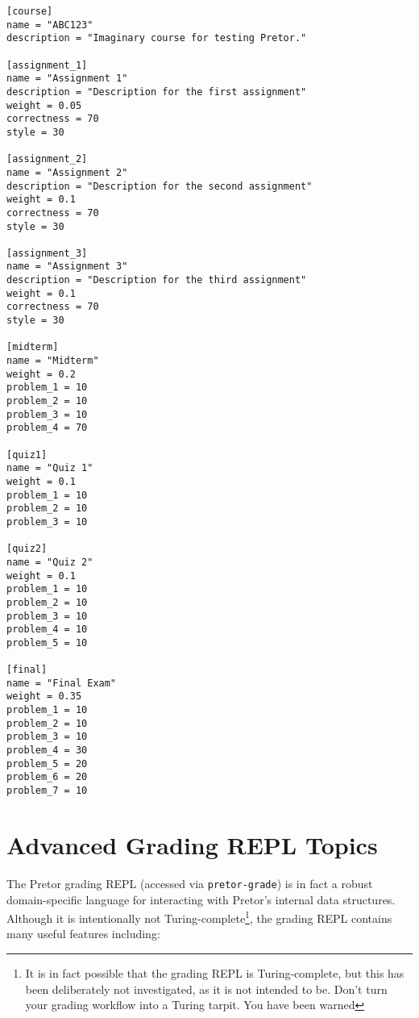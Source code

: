 \documentclass{book}
\begin{document}
\begin{verbatim}
[course]
name = "ABC123"
description = "Imaginary course for testing Pretor."

[assignment_1]
name = "Assignment 1"
description = "Description for the first assignment"
weight = 0.05
correctness = 70
style = 30

[assignment_2]
name = "Assignment 2"
description = "Description for the second assignment"
weight = 0.1
correctness = 70
style = 30

[assignment_3]
name = "Assignment 3"
description = "Description for the third assignment"
weight = 0.1
correctness = 70
style = 30

[midterm]
name = "Midterm"
weight = 0.2
problem_1 = 10
problem_2 = 10
problem_3 = 10
problem_4 = 70

[quiz1]
name = "Quiz 1"
weight = 0.1
problem_1 = 10
problem_2 = 10
problem_3 = 10

[quiz2]
name = "Quiz 2"
weight = 0.1
problem_1 = 10
problem_2 = 10
problem_3 = 10
problem_4 = 10
problem_5 = 10

[final]
name = "Final Exam"
weight = 0.35
problem_1 = 10
problem_2 = 10
problem_3 = 10
problem_4 = 30
problem_5 = 20
problem_6 = 20
problem_7 = 10
\end{verbatim}

\section{Advanced Grading REPL Topics}


The Pretor grading REPL (accessed via \texttt{pretor-grade}) is in fact a
robust domain-specific language for interacting with Pretor's internal data
structures. Although it is intentionally not Turing-complete\footnote{It is in
fact possible that the grading REPL is Turing-complete, but this has been
deliberately not investigated, as it is not intended to be. Don't turn your
grading workflow into a Turing tarpit. You have been warned}, the grading
REPL contains many useful features including:
\end{document}
